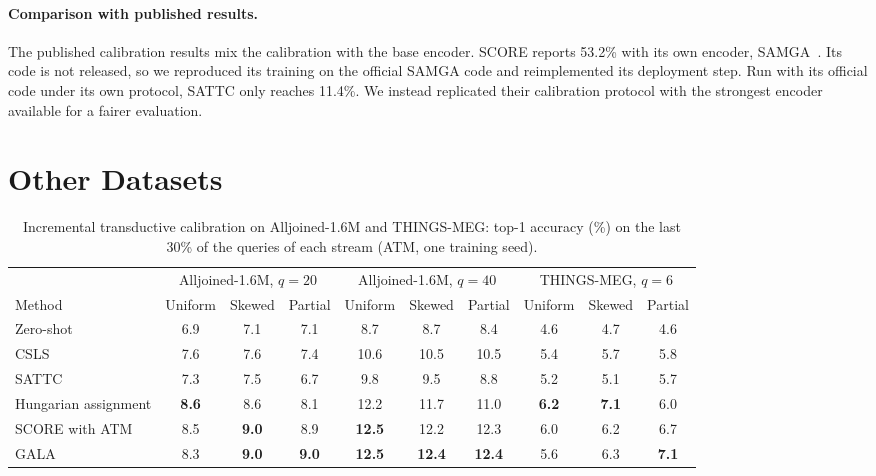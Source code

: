 \documentclass[10pt,twocolumn,letterpaper]{article}
\begin{document}
\paragraph{Comparison with published results.}
The published calibration results mix the calibration with the base encoder. SCORE reports 53.2\% with its own encoder, SAMGA~\cite{jiang2026samga}. Its code is not released, so we reproduced its training on the official SAMGA code and reimplemented its deployment step. Run with its official code under its own protocol, SATTC only reaches 11.4\%. We instead replicated their calibration protocol with the strongest encoder available for a fairer evaluation.


\section{Other Datasets}
\label{app:datasets}

\begin{table}[t]
\caption{Incremental transductive calibration on Alljoined-1.6M and THINGS-MEG: top-1 accuracy (\%) on the last 30\% of the queries of each stream (ATM, one training seed).}
\label{tab:datasets}
\centering
\small
\setlength{\tabcolsep}{5pt}
\begin{tabular}{@{}lccccccccc@{}}
\toprule
 & \multicolumn{3}{c}{Alljoined-1.6M, $q=20$} & \multicolumn{3}{c}{Alljoined-1.6M, $q=40$} & \multicolumn{3}{c}{THINGS-MEG, $q=6$} \\
\cmidrule(lr){2-4}\cmidrule(lr){5-7}\cmidrule(lr){8-10}
Method & Uniform & Skewed & Partial & Uniform & Skewed & Partial & Uniform & Skewed & Partial \\
\midrule
Zero-shot & 6.9 & 7.1 & 7.1 & 8.7 & 8.7 & 8.4 & 4.6 & 4.7 & 4.6 \\
CSLS & 7.6 & 7.6 & 7.4 & 10.6 & 10.5 & 10.5 & 5.4 & 5.7 & 5.8 \\
SATTC~\cite{huang2026sattc} & 7.3 & 7.5 & 6.7 & 9.8 & 9.5 & 8.8 & 5.2 & 5.1 & 5.7 \\
Hungarian assignment & \textbf{8.6} & 8.6 & 8.1 & 12.2 & 11.7 & 11.0 & \textbf{6.2} & \textbf{7.1} & 6.0 \\
SCORE with ATM & 8.5 & \textbf{9.0} & 8.9 & \textbf{12.5} & 12.2 & 12.3 & 6.0 & 6.2 & 6.7 \\
\midrule
GALA & 8.3 & \textbf{9.0} & \textbf{9.0} & \textbf{12.5} & \textbf{12.4} & \textbf{12.4} & 5.6 & 6.3 & \textbf{7.1} \\
\bottomrule
\end{tabular}
\end{table}
\end{document}
